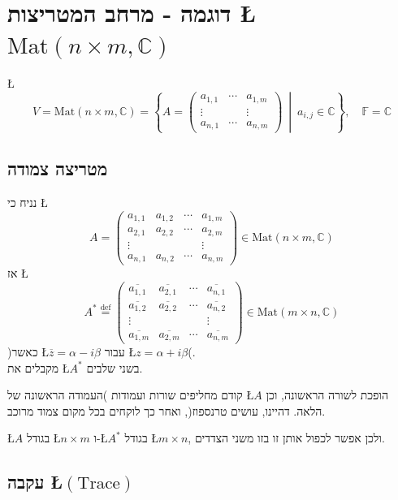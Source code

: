 \documentclass[english,hebrew]{article}
\begin{document}
\section{דוגמה - מרחב המטריצות \L{$\text{Mat}(n\times m,\mathbb{C})$}}

\L{%
\[
V=\text{Mat}(n\times m,\mathbb{C})=\left\{ A=\begin{pmatrix}a_{1,1} & \cdots & a_{1,m}\\
\vdots &  & \vdots\\
a_{n,1} & \cdots & a_{n,m}
\end{pmatrix}\ \middle|\ a_{i,j}\in\mathbb{C}\right\} ,\quad\mathbb{F}=\mathbb{C}
\]
}%

\subsection{מטריצה צמודה}

נניח כי \L{%
\[
A=\begin{pmatrix}a_{1,1} & a_{1,2} & \cdots & a_{1,m}\\
a_{2,1} & a_{2,2} & \cdots & a_{2,m}\\
\vdots &  &  & \vdots\\
a_{n,1} & a_{n,2} & \cdots & a_{n,m}
\end{pmatrix}\in\text{Mat}(n\times m,\mathbb{C})
\]
}%
אז \L{%
\[
A^{*}\overset{\text{def}}{=}\begin{pmatrix}\overline{a_{1,1}} & \overline{a_{2,1}} & \cdots & \overline{a_{n,1}}\\
\overline{a_{1,2}} & \overline{a_{2,2}} & \cdots & \overline{a_{n,2}}\\
\vdots &  &  & \vdots\\
\overline{a_{1,m}} & \overline{a_{2,m}} & \cdots & \overline{a_{n,m}}
\end{pmatrix}\in\text{Mat}(m\times n,\mathbb{C})
\]
}%
)כאשר \L{$\overline{z}=\alpha-i\beta$} עבור \L{$z=\alpha+i\beta$}(.\\

מקבלים את \L{$A^{*}$} בשני שלבים.

קודם מחליפים שורות ועמודות )העמודה הראשונה של \L{$A$} הופכת לשורה
הראשונה, וכן הלאה. דהיינו, עושים טרנספוז(, ואחר כך לוקחים בכל מקום
צמוד מרוכב.

\L{$A$} בגודל \L{$n\times m$} ו-\L{$A^{*}$} בגודל \L{$m\times n$},
ולכן אפשר לכפול אותן זו בזו משני הצדדים.

\subsection{עקבה \L{$(\text{Trace})$}}
\end{document}
